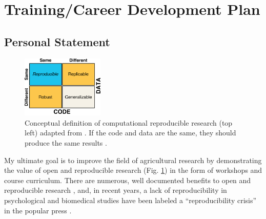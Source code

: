 \documentclass[12pt,letterpaper]{article}
\title{\ruleline{Project Narrative}}
\begin{document}
\maketitle

\section{Training/Career Development Plan}


\subsection{Personal Statement}

\begin{figure}
  \includegraphics[width=0.35\textwidth]{figure/whitaker2017publishing.pdf}
  \caption{Conceptual definition of computational reproducible research (top left) adapted from \citet{whitaker2017publishing}. If the code and data are the same, they should produce the same results \citep{patil2016statistical}.}
  \label{fig:rr-def}
\end{figure}

My ultimate goal is to improve the field of agricultural research by demonstrating the value of open and reproducible research (Fig. \ref{fig:rr-def}) in the form of workshops and course curriculum. 
There are numerous, well documented benefits to open and reproducible research \citep{mckiernan2016open}, and, in recent years, a lack of reproducibility in psychological and biomedical studies have been labeled a ``reproducibility crisis'' in the popular press \citep{baker2016scientists,patil2016statistical}. 
\end{document}
